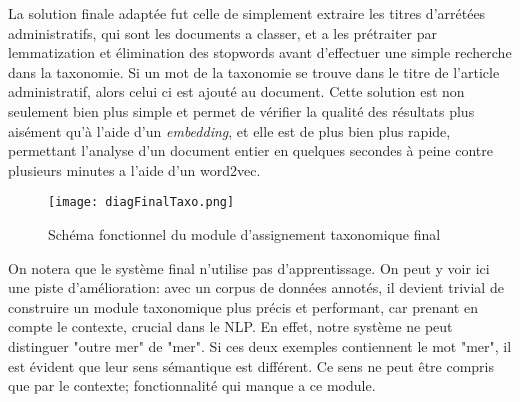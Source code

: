 La solution finale adaptée fut celle de simplement extraire les titres d'arrétées administratifs, qui sont les documents a classer, et a les prétraiter par lemmatization et élimination des stopwords avant d'effectuer une simple recherche dans la taxonomie.
Si un mot de la taxonomie se trouve dans le titre de l'article administratif, alors celui ci est ajouté au document.
Cette solution est non seulement bien plus simple et permet de vérifier la qualité des résultats plus aisément qu'à l'aide d'un \textit{embedding}, et elle est de plus bien plus rapide, permettant l'analyse d'un document entier en quelques secondes à peine contre plusieurs minutes a l'aide d'un word2vec.

\begin{figure}[h!]
  \centering
  \texttt{[image: diagFinalTaxo.png]}
	\caption[]{Schéma fonctionnel du module d'assignement taxonomique final}
  \label{taxoFinal}
\end{figure}

On notera que le système final n'utilise pas d'apprentissage.
On peut y voir ici une piste d'amélioration: avec un corpus de données annotés, il devient trivial de construire un module taxonomique plus précis et performant, car prenant en compte le contexte, crucial dans le NLP.
En effet, notre système ne peut distinguer "outre mer" de "mer". Si ces deux exemples contiennent le mot "mer", il est évident que leur sens sémantique est différent.
Ce sens ne peut être compris que par le contexte; fonctionnalité qui manque a ce module. 

